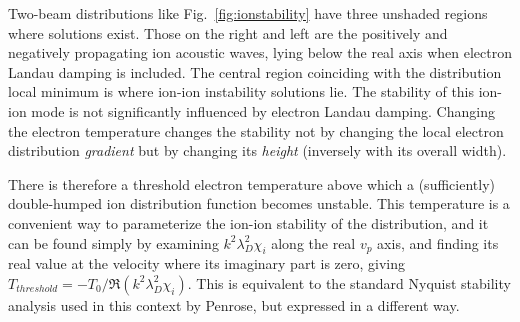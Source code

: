 \documentclass[12pt]{article}
\begin{document}
Two-beam distributions like Fig.\ \ref{fig:ionstability} have three
unshaded regions where solutions exist. Those on the right and left
are the positively and negatively propagating ion acoustic waves,
lying below the real axis when electron Landau damping is
included. The central region coinciding with the distribution local
minimum is where ion-ion instability solutions lie.
The stability of this ion-ion
mode is not significantly influenced by electron Landau damping. Changing
the electron temperature changes the stability not by changing the
local electron distribution \emph{gradient} but by changing its
\emph{height} (inversely with its overall width).  

There is therefore a threshold electron temperature above which a
(sufficiently) double-humped ion distribution function becomes
unstable. This temperature is a convenient way to parameterize the
ion-ion stability of the distribution, and it can be found simply by
examining $k^2\lambda_D^2\chi_i$ along the real $v_p$ axis, and
finding its real value at the velocity where its imaginary part is
zero, giving $T_{threshold}=-T_0/\Re(k^2\lambda_D^2\chi_i)$. This is
equivalent to the standard Nyquist stability analysis used in this
context by Penrose\cite{Penrose1960}, but expressed in a different way.
\end{document}
